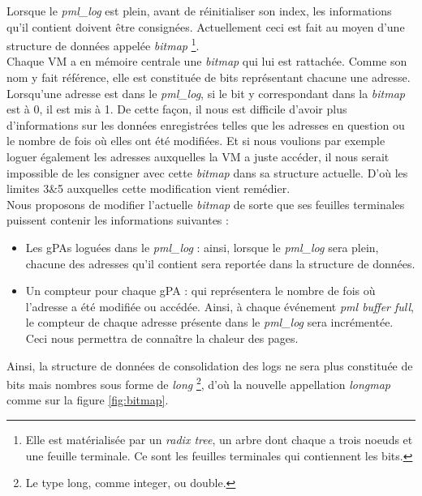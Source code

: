 \noindent Lorsque le \textit{pml\_log} est plein, avant de réinitialiser son index, les informations qu'il contient doivent être consignées. Actuellement ceci est fait au moyen d'une structure de données appelée \textit{bitmap}  \footnote{Elle est matérialisée par un \textit{radix tree}, un arbre dont chaque a trois noeuds et une feuille terminale. Ce sont les feuilles terminales qui contiennent les bits.}.\\
Chaque VM a en mémoire centrale une \textit{bitmap} qui lui est rattachée. Comme son nom y fait référence, elle est constituée de bits représentant chacune une adresse. Lorsqu'une adresse est dans le \textit{pml\_log}, si le bit y correspondant dans la \textit{bitmap} est à 0, il est mis à 1. De cette façon, il nous est difficile d'avoir plus d'informations sur les données enregistrées telles que les adresses en question ou le nombre de fois où elles ont été modifiées. Et si nous voulions par exemple loguer également les adresses auxquelles la VM a juste accéder, il nous serait impossible de les consigner avec cette \textit{bitmap} dans sa structure actuelle. D'où les limites 3\&5 auxquelles cette modification vient remédier.\\
Nous proposons de modifier l'actuelle \textit{bitmap} de sorte que ses feuilles terminales puissent contenir les informations suivantes :
\begin{itemize}
    \item Les gPAs loguées dans le \textit{pml\_log} : ainsi, lorsque le \textit{pml\_log} sera plein, chacune des adresses qu'il contient sera reportée dans la structure de données.
    \item Un compteur pour chaque gPA : qui représentera le nombre de fois où l'adresse a été modifiée ou accédée. Ainsi, à chaque événement \textit{pml buffer full}, le compteur de chaque adresse présente dans le \textit{pml\_log} sera incrémentée. Ceci nous permettra de connaître la chaleur des pages.
\end{itemize}

\noindent Ainsi, la structure de données de consolidation des logs ne sera plus constituée de bits mais nombres sous forme de \textit{long} \footnote{Le type long, comme integer, ou double.}, d'où la nouvelle appellation \textit{longmap} comme sur la figure \ref{fig:bitmap}.

